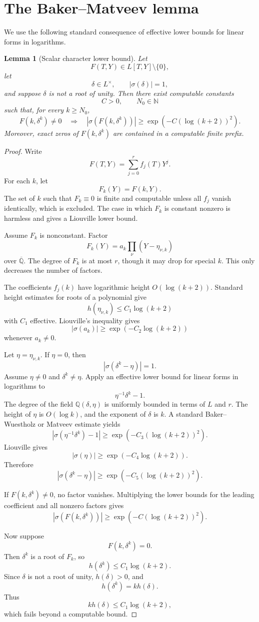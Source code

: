 \documentclass[11pt]{article}
\newtheorem{lemma}[theorem]{Lemma}
\newcommand{\Q}{\mathbb Q}
\begin{document}
\section{The Baker--Matveev lemma}

We use the following standard consequence of effective lower bounds for linear forms in logarithms.

\begin{lemma}[Scalar character lower bound]
Let
\[
F(T,Y)\in L[T,Y]\setminus\{0\},
\]
let
\[
\delta\in L^\times,
\qquad
|\sigma(\delta)|=1,
\]
and suppose \(\delta\) is not a root of unity. Then there exist computable constants
\[
C>0,
\qquad
N_0\in\mathbb N
\]
such that, for every \(k\ge N_0\),
\[
F(k,\delta^k)\ne0
\quad\Longrightarrow\quad
|\sigma(F(k,\delta^k))|
\ge
\exp(-C(\log(k+2))^2).
\]
Moreover, exact zeros of \(F(k,\delta^k)\) are contained in a computable finite prefix.
\end{lemma}

\begin{proof}
Write
\[
F(T,Y)=\sum_{j=0}^r f_j(T)Y^j.
\]
For each \(k\), let
\[
F_k(Y)=F(k,Y).
\]
The set of \(k\) such that \(F_k\equiv0\) is finite and computable unless all \(f_j\) vanish identically, which is excluded. The case in which \(F_k\) is constant nonzero is harmless and gives a Liouville lower bound.

Assume \(F_k\) is nonconstant. Factor
\[
F_k(Y)=a_k\prod_\nu(Y-\eta_{\nu,k})
\]
over \(\overline{\Q}\). The degree of \(F_k\) is at most \(r\), though it may drop for special \(k\). This only decreases the number of factors.

The coefficients \(f_j(k)\) have logarithmic height \(O(\log(k+2))\). Standard height estimates for roots of a polynomial give
\[
h(\eta_{\nu,k})\le C_1\log(k+2)
\]
with \(C_1\) effective. Liouville's inequality gives
\[
|\sigma(a_k)|\ge\exp(-C_2\log(k+2))
\]
whenever \(a_k\ne0\).

Let \(\eta=\eta_{\nu,k}\). If \(\eta=0\), then
\[
|\sigma(\delta^k-\eta)|=1.
\]
Assume \(\eta\ne0\) and \(\delta^k\ne\eta\). Apply an effective lower bound for linear forms in logarithms to
\[
\eta^{-1}\delta^k-1.
\]
The degree of the field \(\Q(\delta,\eta)\) is uniformly bounded in terms of \(L\) and \(r\). The height of \(\eta\) is \(O(\log k)\), and the exponent of \(\delta\) is \(k\). A standard Baker--Wuestholz or Matveev estimate yields
\[
|\sigma(\eta^{-1}\delta^k)-1|
\ge
\exp(-C_3(\log(k+2))^2).
\]
Liouville gives
\[
|\sigma(\eta)|\ge\exp(-C_4\log(k+2)).
\]
Therefore
\[
|\sigma(\delta^k-\eta)|
\ge
\exp(-C_5(\log(k+2))^2).
\]

If \(F(k,\delta^k)\ne0\), no factor vanishes. Multiplying the lower bounds for the leading coefficient and all nonzero factors gives
\[
|\sigma(F(k,\delta^k))|
\ge
\exp(-C(\log(k+2))^2).
\]

Now suppose
\[
F(k,\delta^k)=0.
\]
Then \(\delta^k\) is a root of \(F_k\), so
\[
h(\delta^k)\le C_1\log(k+2).
\]
Since \(\delta\) is not a root of unity, \(h(\delta)>0\), and
\[
h(\delta^k)=k h(\delta).
\]
Thus
\[
k h(\delta)\le C_1\log(k+2),
\]
which fails beyond a computable bound.
\end{proof}
\end{document}

